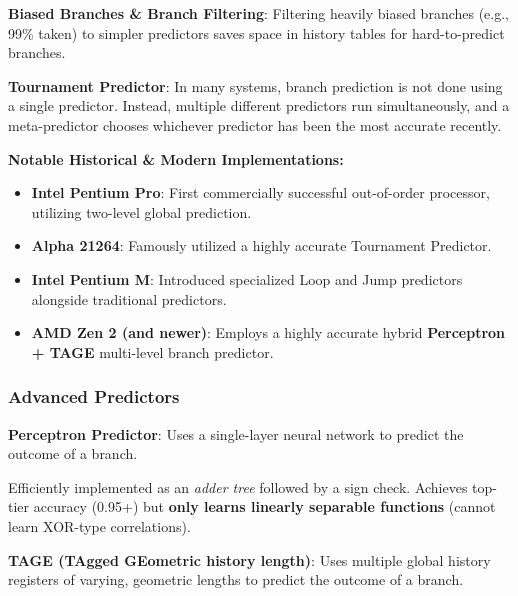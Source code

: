 \begin{important}
	\textbf{Biased Branches \& Branch Filtering}: Filtering heavily biased branches (e.g., 99\% taken) to simpler predictors saves space in history tables for hard-to-predict branches.
\end{important}

\begin{important}
	\textbf{Tournament Predictor}: In many systems, branch prediction is not done using a single predictor. Instead, multiple different predictors run simultaneously, and a meta-predictor chooses whichever predictor has been the most accurate recently.
\end{important}

\begin{remark}
	\textbf{Notable Historical \& Modern Implementations:}
	\begin{itemize}
		\item \textbf{Intel Pentium Pro}: First commercially successful out-of-order processor, utilizing two-level global prediction.
		\item \textbf{Alpha 21264}: Famously utilized a highly accurate Tournament Predictor.
		\item \textbf{Intel Pentium M}: Introduced specialized Loop and Jump predictors alongside traditional predictors.
		\item \textbf{AMD Zen 2 (and newer)}: Employs a highly accurate hybrid \textbf{Perceptron + TAGE} multi-level branch predictor.
	\end{itemize}
\end{remark}

\subsubsection{Advanced Predictors}

\begin{definition}
	\textbf{Perceptron Predictor}: Uses a single-layer neural network to predict the outcome of a branch.
\end{definition}

\begin{remark}
	Efficiently implemented as an \textit{adder tree} followed by a sign check. Achieves top-tier accuracy (0.95+) but \textbf{only learns linearly separable functions} (cannot learn XOR-type correlations).
\end{remark}

\begin{definition}
	\textbf{TAGE (TAgged GEometric history length)}: Uses multiple global history registers of varying, geometric lengths to predict the outcome of a branch.
\end{definition}

